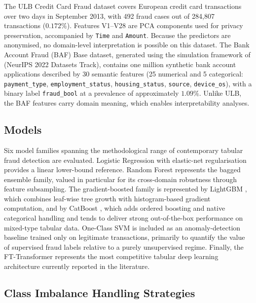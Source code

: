 \documentclass[a4paper,fleqn]{cas-sc}
\begin{document}
The ULB Credit Card Fraud dataset covers European credit card transactions over two
days in September 2013, with 492 fraud cases out of 284{,}807 transactions ($0.172\%$).
Features V1--V28 are PCA components used for privacy preservation, accompanied by
\texttt{Time} and \texttt{Amount}. Because the predictors are anonymised, no
domain-level interpretation is possible on this dataset.
The Bank Account Fraud (BAF) Base dataset, generated using the simulation framework of
\citet{jesus2022turning} (NeurIPS 2022 Datasets Track), contains one million synthetic
bank account applications described by 30 semantic features (25 numerical and 5
categorical: \texttt{payment\_type}, \texttt{employment\_status}, \texttt{housing\_status},
\texttt{source}, \texttt{device\_os}), with a binary label \texttt{fraud\_bool} at a
prevalence of approximately $1.09\%$. Unlike ULB, the BAF features carry domain
meaning, which enables interpretability analyses.

\subsection{Models}
\label{subsec:models}

Six model families spanning the methodological range of contemporary tabular fraud
detection are evaluated. Logistic Regression with elastic-net regularisation
\citep{tibshirani1996regression} provides a linear lower-bound reference. Random Forest
\citep{breiman2001random} represents the bagged ensemble family, valued in particular
for its cross-domain robustness through feature subsampling. The gradient-boosted
family is represented by LightGBM \citep{ke2017lightgbm}, which combines leaf-wise tree
growth with histogram-based gradient computation, and by CatBoost
\citep{prokhorenkova2018catboost}, which adds ordered boosting and native categorical
handling and tends to deliver strong out-of-the-box performance on mixed-type tabular
data. One-Class SVM \citep{scholkopf2001estimating} is included as an anomaly-detection
baseline trained only on legitimate transactions, primarily to quantify the value of
supervised fraud labels relative to a purely unsupervised regime. Finally, the
FT-Transformer \citep{gorishniy2021revisiting} represents the most competitive tabular
deep learning architecture currently reported in the literature.

\subsection{Class Imbalance Handling Strategies}
\label{subsec:strategies}
\end{document}
